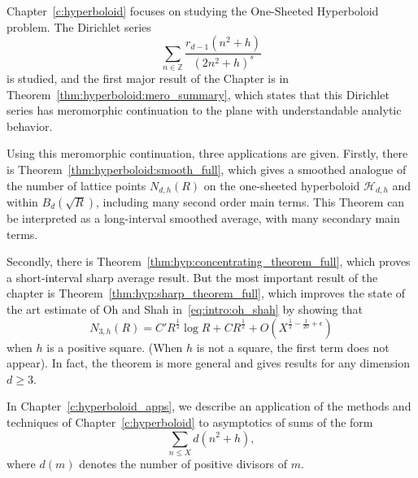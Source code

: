Chapter~\ref{c:hyperboloid} focuses on studying the One-Sheeted Hyperboloid problem.
The Dirichlet series
\begin{equation}
  \sum_{n \in \mathbb{Z}} \frac{r_{d-1}(n^2 + h)}{(2n^2 + h)^s}
\end{equation}
is studied, and the first major result of the Chapter is in
Theorem~\ref{thm:hyperboloid:mero_summary}, which states that this Dirichlet series has
meromorphic continuation to the plane with understandable analytic behavior.

Using this meromorphic continuation, three applications are given.
Firstly, there is Theorem~\ref{thm:hyperboloid:smooth_full}, which gives a smoothed
analogue of the number of lattice points $N_{d,h}(R)$ on the one-sheeted hyperboloid
$\mathcal{H}_{d,h}$ and within $B_d(\sqrt R)$, including many second order main terms.
This Theorem can be interpreted as a long-interval smoothed average, with many secondary
main terms.


Secondly, there is Theorem~\ref{thm:hyp:concentrating_theorem_full}, which proves a
short-interval sharp average result.
But the most important result of the chapter is Theorem~\ref{thm:hyp:sharp_theorem_full},
which improves the state of the art estimate of Oh and Shah in~\eqref{eq:intro:oh_shah} by
showing that
\begin{equation}
  N_{3,h}(R) = C' R^{\frac{1}{2}} \log R + C R^{\frac{1}{2}} + O(X^{\frac{1}{2} -
  \frac{1}{20} + \epsilon})
\end{equation}
when $h$ is a positive square.
(When $h$ is not a square, the first term does not appear).
In fact, the theorem is more general and gives results for any dimension $d \geq 3$.


In Chapter~\ref{c:hyperboloid_apps}, we describe an application of the methods and
techniques of Chapter~\ref{c:hyperboloid} to asymptotics of sums of the form
\begin{equation}
  \sum_{n \leq X} d(n^2 + h),
\end{equation}
where $d(m)$ denotes the number of positive divisors of $m$.


